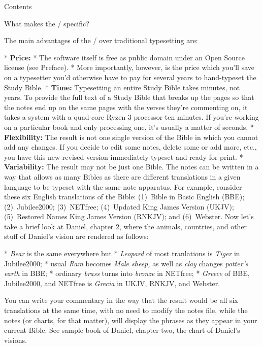 {%



\notoc\nonum\sec Contents
\maketoc
\vfil\break



\sec What makes the \OpBible/ specific?

The main advantages of the \OpBible/ over traditional typesetting are:

\begitems
* {\bf Price:} \begitems
  * The software itself is free as public domain under an Open Source license (see Preface). 
  * More importantly, however, is the price which
  you'll save on a typesetter you'd otherwise have to pay for several years to hand-typeset the Study Bible.
        \enditems
* {\bf Time:} Typesetting an entire Study Bible takes minutes, not years. To provide the full text of a Study Bible  that breaks up the pages so that the notes end up on the same pages with
  the verses they're commenting on, it takes a system with a quad-core Ryzen 3 processor
  ten minutes. If you're working on a particular book and only processing one, it's usually a matter of seconds.
* {\bf Flexibility:} The result is not one single version of the Bible in which you cannot 
add  any changes. If you decide to edit some notes, delete some or add more, etc.,
  you have this new revised version immediately typeset and ready for print.
* {\bf Variability:} The result may not be
  just one Bible. The notes can be written in a way that allows as many Bibles as there are different translations in a given language to be typeset with the same note apparatus. 
  For example, consider these six English translations of the Bible: 
(1)~Bible in Basic English (BBE); (2)~Jubilee2000; (3)~NETfree; (4)~Updated King James Version (UKJV); (5)~Restored Names King James Version (RNKJV); and (6)~Webster.
Now let's take a brief look at Daniel, chapter 2, where the animals, countries, and other stuff of Daniel's vision are rendered as follows: 

\begitems
* {\it Bear\/} is the same everywhere but
* {\it Leopard\/} of most tranlations is {\it Tiger\/} in Jubilee2000;
* usual {\it Ram\/} becomes {\it Male sheep,\/} as well as {\it clay\/} changes {\it potter's earth\/} in BBE;
* ordinary {\it brass\/} turns into {\it bronze\/} in NETfree;
* {\it Greece\/} of BBE, Jubilee2000, and NETfree is {\it Grecia\/} in UKJV, RNKJV, and Webster.
\enditems

You can write your commentary in the way that the result would be all six translations at the same time, with no need to modify the notes file, while the notes (or charts, for that matter), will display the phrases as they appear in your current Bible. See sample book of Daniel, chapter two, the chart of Daniel's visions.

}
